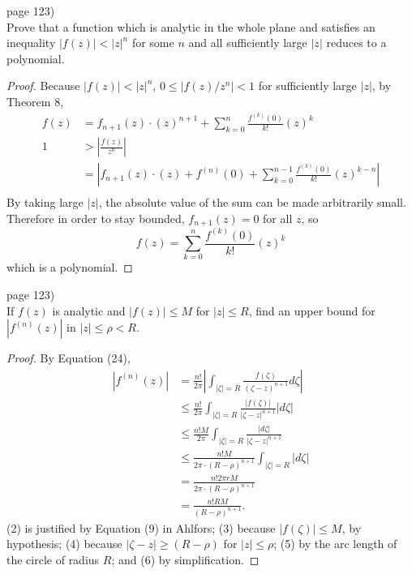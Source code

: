 \documentclass{article}
\newenvironment{problem}[2][Problem]{\begin{trivlist}
\item[\hskip \labelsep {\bfseries #1}\hskip \labelsep {\bfseries #2.}]}{\end{trivlist}}
\begin{document}
\pagebreak

\begin{problem}{2} (page 123) \\
  Prove that a function which is analytic in the whole plane and satisfies an
  inequality $|f(z)| < |z|^n$ for some $n$ and all sufficiently large $|z|$
  reduces to a polynomial.
\end{problem}

\begin{proof}
  Because $|f(z)| < |z|^n$, $0 \leq |f(z)/z^n| < 1$ for sufficiently large $|z|$,
  by Theorem 8, \begin{align*}
    f(z) &= f_{n+1}(z)\cdot(z)^{n+1} + \sum_{k = 0}^{n} \frac{f^{(k)}(0)}{k!}(z)^k \\
    1 &> \left|\frac{f(z)}{z^n}\right|\\
    &= \left|f_{n+1}(z)\cdot(z) + f^{(n)}(0) + \sum_{k = 0}^{n-1} \frac{f^{(k)}(0)}{k!}(z)^{k-n}\right| \\
  \end{align*}
  By taking large $|z|$, the absolute value of the sum can be made arbitrarily
  small. Therefore in order to stay bounded, $f_{n+1}(z) = 0$ for all $z$, so \[
    f(z) = \sum_{k = 0}^{n} \frac{f^{(k)}(0)}{k!}(z)^k
  \] which is a polynomial.
\end{proof}

\pagebreak

\begin{problem}{3} (page 123) \\
  If $f(z)$ is analytic and $|f(z)| \leq M$ for $|z| \leq R$, find an upper
  bound for $|f^{(n)}(z)|$ in $|z| \leq \rho < R$.
\end{problem}

\begin{proof}
  By Equation (24), \begin{align}
    |f^{(n)}(z)|
    &= \frac{n!}{2\pi}\left|\int_{|\zeta| = R} \frac{f(\zeta)}{(\zeta - z)^{n+1}}d\zeta\right|\\
    &\leq \frac{n!}{2\pi}\int_{|\zeta| = R} \frac{|f(\zeta)|}{|\zeta - z|^{n+1}}|d\zeta|\\
    &\leq \frac{n!M}{2\pi}\int_{|\zeta| = R} \frac{|d\zeta|}{|\zeta - z|^{n+1}}\\
    &\leq \frac{n!M}{2\pi\cdot(R-\rho)^{n+1}}\int_{|\zeta| = R} |d\zeta|\\
    &= \frac{n!2\pi rM}{2\pi\cdot(R-\rho)^{n+1}} \\
    &= \frac{n!RM}{(R-\rho)^{n+1}}.
  \end{align}
  (2) is justified by Equation (9) in Ahlfors;
  (3) because $|f(\zeta)| \leq M$, by hypothesis;
  (4) because $|\zeta - z| \geq (R-\rho)$ for $|z| \leq \rho$;
  (5) by the arc length of the circle of radius $R$; and (6) by simplification.
\end{proof}
\end{document}
